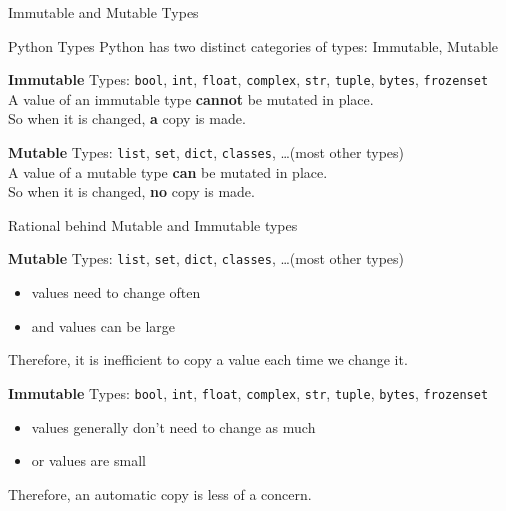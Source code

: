 \documentclass[10pt, colorlinks=true, urlcolor=blue]{beamer}
\begin{document}
\begin{frame}{Immutable and Mutable Types}
  \begin{block}{Python Types}
    Python has two distinct categories of types: Immutable, Mutable
  \end{block}
  
  \vspace{2.4em}
  
  \textbf{Immutable} Types: \texttt{bool}, \texttt{int}, \texttt{float}, \texttt{complex}, \texttt{str}, \texttt{tuple}, \texttt{bytes}, \texttt{frozenset} \\
  
  \vspace{-0.8em}
  A value of an immutable type \textbf{cannot} be mutated in place. \\
  So when it is changed, \textbf{a} copy is made. \\
  
  \vspace{2.0em}
  
  \textbf{Mutable} Types: \texttt{list}, \texttt{set}, \texttt{dict}, \texttt{classes}, \dots (most other types) \\
  
  \vspace{-0.8em}
  A value of a mutable type \textbf{can} be mutated in place. \\
  So when it is changed, \textbf{no} copy is made.
\end{frame}

\begin{frame}{Rational behind Mutable and Immutable types}
 
  \textbf{Mutable} Types: \texttt{list}, \texttt{set}, \texttt{dict}, \texttt{classes}, \dots (most other types)
  \begin{itemize}
  \item values need to change often
  \item and values can be large
  \end{itemize}
  Therefore, it is inefficient to copy a value each time we change it.
  
  \vspace{3em}
  
  \textbf{Immutable} Types: \texttt{bool}, \texttt{int}, \texttt{float}, \texttt{complex}, \texttt{str}, \texttt{tuple}, \texttt{bytes}, \texttt{frozenset}
  \begin{itemize}
  \item values generally don't need to change as much
  \item or values are small
  \end{itemize}
  Therefore, an automatic copy is less of a concern.

  \vspace{2em}
  
\end{frame}
\end{document}
